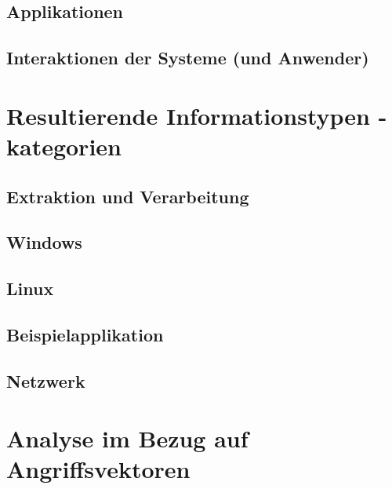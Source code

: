 \subsection{Applikationen}



\subsection{Interaktionen der Systeme (und Anwender)}





\section{Resultierende Informationstypen \/ -kategorien}
\subsection{Extraktion und Verarbeitung}
\subsection{Windows}
\subsection{Linux}
\subsection{Beispielapplikation}
\subsection{Netzwerk}
\section{Analyse im Bezug auf Angriffsvektoren}